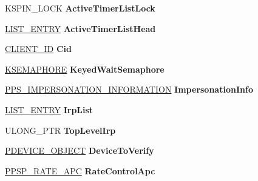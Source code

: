 \begin{DoxyCompactItemize}
\begin{tabbing}
\end{tabbing}\item 
\mbox{\label{struct___e_t_h_r_e_a_d_aa4645d1828bfc8206ea4862738133f29}} 
K\+S\+P\+I\+N\+\_\+\+L\+O\+CK {\bfseries Active\+Timer\+List\+Lock}
\item 
\mbox{\label{struct___e_t_h_r_e_a_d_a9c9c2b73cb074c4ca63f5f47a8bc4a18}} 
\hyperlink{struct___l_i_s_t___e_n_t_r_y}{L\+I\+S\+T\+\_\+\+E\+N\+T\+RY} {\bfseries Active\+Timer\+List\+Head}
\item 
\mbox{\label{struct___e_t_h_r_e_a_d_a620580759e557a79529a0872bed726c4}} 
\hyperlink{struct___c_l_i_e_n_t___i_d}{C\+L\+I\+E\+N\+T\+\_\+\+ID} {\bfseries Cid}
\item 
\mbox{\label{struct___e_t_h_r_e_a_d_ac70b56a8bf03c9d612d8a1058da19403}} 
\hyperlink{struct___k_s_e_m_a_p_h_o_r_e}{K\+S\+E\+M\+A\+P\+H\+O\+RE} {\bfseries Keyed\+Wait\+Semaphore}
\item 
\mbox{\label{struct___e_t_h_r_e_a_d_a0fd9b03e874e8b09ac0587bae7557b19}} 
\hyperlink{struct___p_s___i_m_p_e_r_s_o_n_a_t_i_o_n___i_n_f_o_r_m_a_t_i_o_n}{P\+P\+S\+\_\+\+I\+M\+P\+E\+R\+S\+O\+N\+A\+T\+I\+O\+N\+\_\+\+I\+N\+F\+O\+R\+M\+A\+T\+I\+ON} {\bfseries Impersonation\+Info}
\item 
\mbox{\label{struct___e_t_h_r_e_a_d_a72bb7b62a9f61a2c3a8f9da12dbd6990}} 
\hyperlink{struct___l_i_s_t___e_n_t_r_y}{L\+I\+S\+T\+\_\+\+E\+N\+T\+RY} {\bfseries Irp\+List}
\item 
\mbox{\label{struct___e_t_h_r_e_a_d_a3e2799d2cda233bc1dcbc95e387f2d52}} 
U\+L\+O\+N\+G\+\_\+\+P\+TR {\bfseries Top\+Level\+Irp}
\item 
\mbox{\label{struct___e_t_h_r_e_a_d_aa77213083a2aea45060047dd143bf876}} 
\hyperlink{struct___d_e_v_i_c_e___o_b_j_e_c_t}{P\+D\+E\+V\+I\+C\+E\+\_\+\+O\+B\+J\+E\+CT} {\bfseries Device\+To\+Verify}
\item 
\mbox{\label{struct___e_t_h_r_e_a_d_ac2b05a5aa103e4ca1c4de979a2eb8dde}} 
\hyperlink{struct___p_s_p___r_a_t_e___a_p_c}{P\+P\+S\+P\+\_\+\+R\+A\+T\+E\+\_\+\+A\+PC} {\bfseries Rate\+Control\+Apc}

\end{DoxyCompactItemize}
